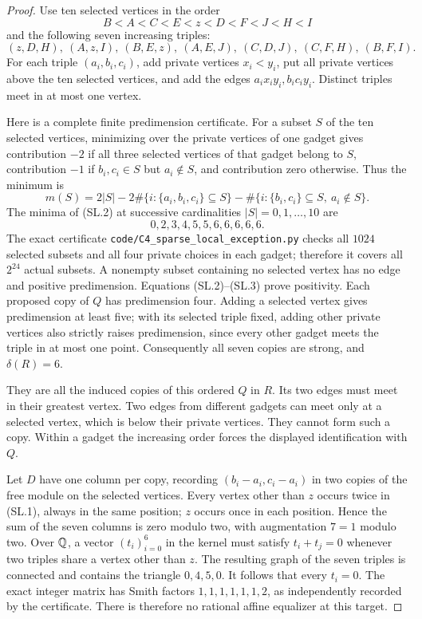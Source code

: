 \begin{proof}
Use ten selected vertices in the order
\[
 B<A<C<E<z<D<F<J<H<I
\]
and the following seven increasing triples:
\[
 (z,D,H),\ (A,z,I),\ (B,E,z),\ (A,E,J),\
 (C,D,J),\ (C,F,H),\ (B,F,I).
 \tag{SL.1}
\]
For each triple $(a_i,b_i,c_i)$, add private vertices
$x_i<y_i$, put all private vertices above the ten selected
vertices, and add the edges $a_ix_iy_i,b_ic_iy_i$.
Distinct triples meet in at most one vertex.

Here is a complete finite predimension certificate. For a
subset $S$ of the ten selected vertices, minimizing over
the private vertices of one gadget gives contribution
$-2$ if all three selected vertices of that gadget belong
to $S$, contribution $-1$ if $b_i,c_i\in S$ but $a_i\notin S$,
and contribution zero otherwise. Thus the minimum is
\[
 m(S)=2|S|-2\#\{i:\{a_i,b_i,c_i\}\subseteq S\}
       -\#\{i:\{b_i,c_i\}\subseteq S,\ a_i\notin S\}.
 \tag{SL.2}
\]
The minima of (SL.2) at successive cardinalities
$|S|=0,1,\ldots,10$ are
\[
 0,2,3,4,5,5,6,6,6,6,6.
 \tag{SL.3}
\]
The exact certificate \texttt{code/C4\_sparse\_local\_exception.py}
checks all $1024$ selected subsets and all four private
choices in each gadget; therefore it covers all $2^{24}$
actual subsets. A nonempty subset containing no selected
vertex has no edge and positive predimension. Equations
(SL.2)--(SL.3) prove positivity. Each proposed copy of $Q$
has predimension four. Adding a selected vertex gives
predimension at least five; with its selected triple fixed,
adding other private vertices also strictly raises
predimension, since every other gadget meets the triple
in at most one point. Consequently all seven copies are
strong, and $\delta(R)=6$.

They are all the induced copies of this ordered $Q$ in $R$.
Its two edges must meet in their greatest vertex. Two
edges from different gadgets can meet only at a selected
vertex, which is below their private vertices. They cannot
form such a copy. Within a gadget the increasing order
forces the displayed identification with $Q$.

Let $D$ have one column per copy, recording
$(b_i-a_i,c_i-a_i)$ in two copies of the free module on
the selected vertices. Every vertex other than $z$ occurs
twice in (SL.1), always in the same position; $z$ occurs
once in each position. Hence the sum of the seven columns
is zero modulo two, with augmentation $7=1$ modulo two.
Over $\mathbb Q$, a vector $(t_i)_{i=0}^6$ in the kernel must
satisfy $t_i+t_j=0$ whenever two triples share a vertex
other than $z$. The resulting graph of the seven triples
is connected and contains the triangle $0,4,5,0$.
It follows that every $t_i=0$. The exact integer matrix
has Smith factors $1,1,1,1,1,1,2$, as independently
recorded by the certificate. There is therefore no
rational affine equalizer at this target.


\end{proof}
